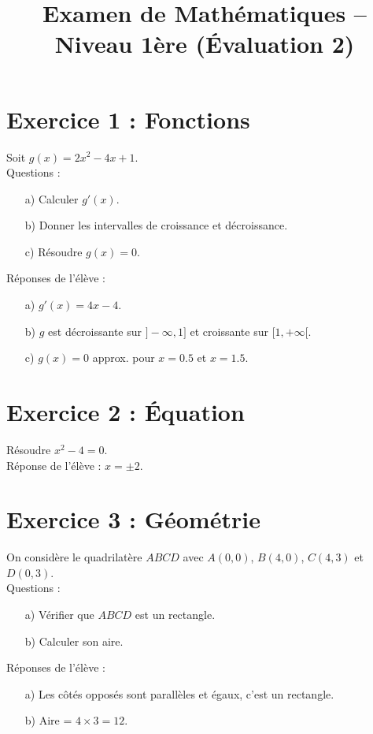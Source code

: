 \documentclass{article}
\begin{document}
\title{Examen de Mathématiques – Niveau 1ère (Évaluation 2)}
\maketitle

\section*{Exercice 1 : Fonctions}
Soit $g(x) = 2x^2 - 4x + 1$.\\
Questions :
\begin{enumerate}
    \item[a)] Calculer $g'(x)$.
    \item[b)] Donner les intervalles de croissance et décroissance.
    \item[c)] Résoudre $g(x) = 0$.
\end{enumerate}
Réponses de l'élève :
\begin{enumerate}
    \item[a)] $g'(x) = 4x - 4$.
    \item[b)] $g$ est décroissante sur $]-\infty, 1]$ et croissante sur $[1, +\infty[$.
    \item[c)] $g(x) = 0$ approx. pour $x = 0.5$ et $x = 1.5$.
\end{enumerate}

\section*{Exercice 2 : Équation}
Résoudre $x^2 - 4 = 0$.\\
Réponse de l'élève :
$x = \pm 2$.

\section*{Exercice 3 : Géométrie}
On considère le quadrilatère $ABCD$ avec $A(0,0)$, $B(4,0)$, $C(4,3)$ et $D(0,3)$.\\
Questions :
\begin{enumerate}
    \item[a)] Vérifier que $ABCD$ est un rectangle.
    \item[b)] Calculer son aire.
\end{enumerate}
Réponses de l'élève :
\begin{enumerate}
    \item[a)] Les côtés opposés sont parallèles et égaux, c'est un rectangle.
    \item[b)] Aire = $4 \times 3 = 12$.
\end{enumerate}
\end{document}
